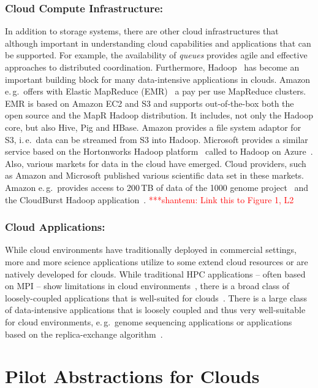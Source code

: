 \documentclass[times]{cpeauth}
\newcommand{\jhanote}[1]{ {\textcolor{red} { ***shantenu: #1 }}}
\newcommand{\jhanote}[1]{}
\begin{document}
\subsubsection*{Cloud Compute Infrastructure:} In addition to storage systems,
there are other cloud infrastructures that although important in
understanding cloud capabilities and applications that can be
supported. For example, the availability of {\it queues} provides
agile and effective approaches to distributed coordination.
Furthermore, Hadoop~\cite{hadoop} has become an important building
block for many data-intensive applications in clouds. Amazon
e.\,g.\ offers with Elastic MapReduce (EMR)~\cite{amazonemr} a pay per
use MapReduce clusters. EMR is based on Amazon EC2 and S3 and supports
out-of-the-box both the open source and the MapR Hadoop
distribution. It includes, not only the Hadoop core, but also Hive,
Pig and HBase. Amazon provides a file system adaptor for S3,
i.\,e.\ data can be streamed from S3 into Hadoop. Microsoft provides a
similar service based on the Hortonworks Hadoop
platform~\cite{hortonworks} called to Hadoop on
Azure~\cite{hadooponazure}. Also, various markets for data in the
cloud have emerged. Cloud providers, such as Amazon and Microsoft
published various scientific data set in these markets. Amazon
e.\,g.\ provides access to 200\,TB of data of the 1000 genome
project~\cite{amazon-1000genomes} and the CloudBurst Hadoop
application~\cite{schatz2009}. \jhanote{Link this to Figure 1, L2}


\subsubsection*{Cloud Applications:}
While cloud environments have traditionally deployed in commercial
settings, more and more science applications utilize to some extend
cloud resources or are natively developed for clouds. While
traditional HPC applications -- often based on MPI -- show limitations
in cloud
environments~\cite{Evangelinos2008,Mehrotra:2012:PEA:2287036.2287045},
there is a broad class of loosely-coupled applications that is
well-suited for clouds~\cite{1851544,Sehgal2011590}. There is a large
class of data-intensive applications that is loosely coupled and thus
very well-suitable for cloud environments, e.\,g.\ genome sequencing
applications or applications based on the replica-exchange
algorithm~\cite{bigjob_cloudcom10}.




\section{Pilot Abstractions for Clouds}
\end{document}
